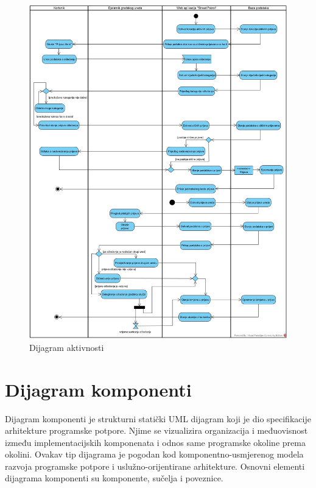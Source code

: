 			\begin{figure}[H]
				\includegraphics[width=\textwidth]{slike/dijagramAktivnosti.jpg} %
				\caption{Dijagram aktivnosti}
				\label{fig:dijagramAktivnosti} %
			\end{figure}
			
			\eject
			
			\section{Dijagram komponenti}
	
			Dijagram komponenti je strukturni statički UML dijagram koji je dio specifikacije arhitekture programske potpore. Njime se vizualizira organizacija i međuovisnost između implementacijskih komponenata i odnos same programske okoline prema okolini. Ovakav tip dijagrama je pogodan kod komponentno-usmjerenog modela razvoja programske potpore i uslužno-orijentirane arhitekture. Osnovni elementi dijagrama komponenti su komponente, sučelja i poveznice.
			
